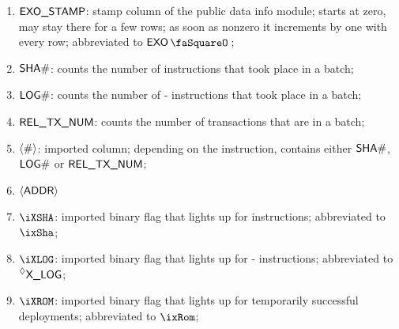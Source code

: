 \begin{enumerate}
	\item $\textsf{EXO\_STAMP}{}$:
		stamp column of the public data info module; starts at zero, may stay there for a few rows; as soon as nonzero it increments by one with every row; abbreviated to $\exoStamp{}$;
	\item $\textsf{SHA\#}$:
		counts the number of  instructions that took place in a batch;
	\item $\textsf{LOG\#}$:
		counts the number of - instructions that took place in a batch;
	\item $\textsf{REL\_TX\_NUM}$:
		counts the number of transactions that are in a batch;
	\item $\langle{}\#\rangle{}$:
		imported column; depending on the instruction, contains either $\textsf{SHA\#}$, $\textsf{LOG\#}$ or $\textsf{REL\_TX\_NUM}$;
	\item $\langle{}\textsf{ADDR}\rangle{}$
	\item $\iXSHA$:
		imported binary flag that lights up for  instructions; abbreviated to $\ixSha$;
	\item $\iXLOG$:
		imported binary flag that lights up for - instructions; abbreviated to $\prescript{\lozenge}{}{\textsf{X\_LOG}}$;
	\item $\iXROM$:
		imported binary flag that lights up for temporarily successful deployments; abbreviated to $\ixRom$;
\end{enumerate}

